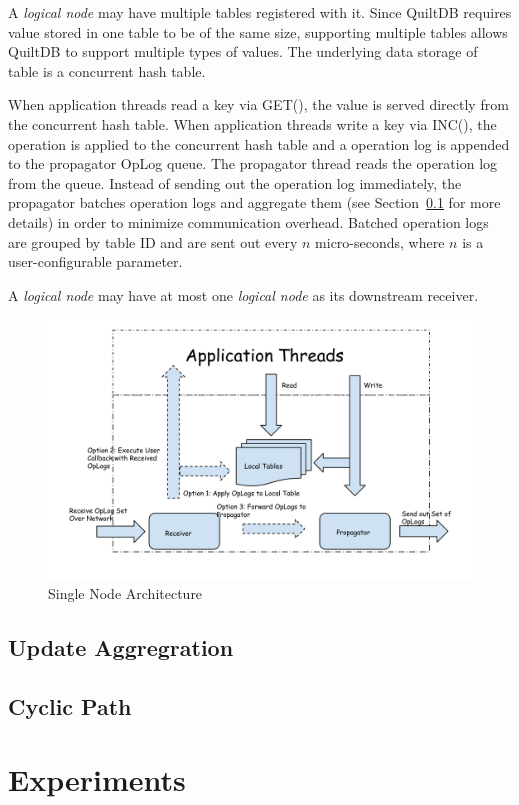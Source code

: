\documentclass{acm_proc_article-sp}
\begin{document}
A \emph{logical node} may have multiple tables registered with it. Since QuiltDB
requires value stored in one table to be of the same size, supporting multiple 
tables allows QuiltDB to support multiple types of values. The underlying data 
storage of table is a concurrent hash table.

When application threads read a key via GET(), the value is served directly from
the concurrent hash table. When application threads write a key via INC(), the 
operation is applied to the concurrent hash table and a operation log is 
appended to the propagator OpLog queue. The propagator thread reads the 
operation log from the queue. Instead of sending out the operation log 
immediately, the propagator batches operation logs and aggregate them (see
Section~\ref{sec:update-aggreg} for more details) in order to minimize 
communication overhead. Batched operation logs are grouped by table ID and are
sent out every $n$ micro-seconds, where $n$ is a user-configurable parameter.

A \emph{logical node} may have at most one \emph{logical node} as its downstream
receiver.

\begin{figure}[th!]
  \centering
  \includegraphics[width=.5\textwidth]{fig/propagator-receiver.pdf}
  \caption{Single Node Architecture}
  \label{fig:prop-recv}
\end{figure}

\subsection{Update Aggregration}
\label{sec:update-aggreg}

\subsection{Cyclic Path}

\section{Experiments}
\end{document}
